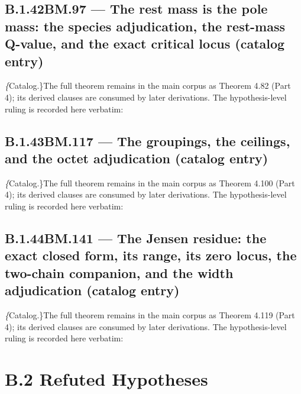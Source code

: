 \documentclass[11pt,openany]{report}
\theoremstyle{canonplain}
\theoremstyle{canondef}
\begin{document}
\subsection*{\texorpdfstring{B.1.42\quad BM.97 — The rest mass is the pole mass: the species adjudication, the rest-mass Q-value, and the exact critical locus (catalog entry)}{BM.97 B.1.42}}
\label{tag:BM-97-cat}
{\small \textit\{Catalog.\}\quad The full theorem remains in the main corpus as Theorem 4.82 (Part 4); its derived clauses are consumed by later derivations. The hypothesis-level ruling is recorded here verbatim:}
\begin{quote}\small \end{quote}
\medskip
\subsection*{\texorpdfstring{B.1.43\quad BM.117 — The groupings, the ceilings, and the octet adjudication (catalog entry)}{BM.117 B.1.43}}
\label{tag:BM-117-cat}
{\small \textit\{Catalog.\}\quad The full theorem remains in the main corpus as Theorem 4.100 (Part 4); its derived clauses are consumed by later derivations. The hypothesis-level ruling is recorded here verbatim:}
\begin{quote}\small \end{quote}
\medskip
\subsection*{\texorpdfstring{B.1.44\quad BM.141 — The Jensen residue: the exact closed form, its range, its zero locus, the two-chain companion, and the width adjudication (catalog entry)}{BM.141 B.1.44}}
\label{tag:BM-141-cat}
{\small \textit\{Catalog.\}\quad The full theorem remains in the main corpus as Theorem 4.119 (Part 4); its derived clauses are consumed by later derivations. The hypothesis-level ruling is recorded here verbatim:}
\begin{quote}\small \end{quote}
\medskip
\section*{\texorpdfstring{B.2 Refuted Hypotheses}{B.2 Refuted Hypotheses}}
\end{document}
